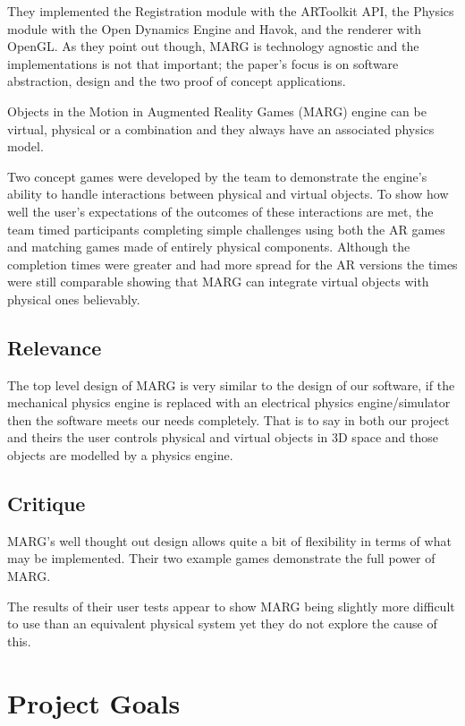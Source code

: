 They implemented the Registration module with the ARToolkit API, the Physics module with the Open Dynamics Engine and Havok, and the renderer with OpenGL. As they point out though, MARG is technology agnostic and the implementations is not that important; the paper's focus is on software abstraction, design and the two proof of concept applications.

Objects in the Motion in Augmented Reality Games (MARG) engine can be virtual, physical or a combination and they always have an associated physics model.

Two concept games were developed by the team to demonstrate the engine's ability to handle interactions between physical and virtual objects. To show how well the user's expectations of the outcomes of these interactions are met, the team timed participants completing simple challenges using both the AR games and matching games made of entirely physical components. Although the completion times were greater and had more spread for the AR versions the times were still comparable
showing that MARG can integrate virtual objects with physical ones believably.

\subsection{Relevance}
The top level design of MARG is very similar to the design of our software, if the mechanical physics engine is replaced with an electrical physics engine/simulator then the software meets our needs completely. That is to say in both our project and theirs the user controls physical and virtual objects in 3D space and those objects are modelled by a physics engine.

\subsection{Critique}
MARG's well thought out design allows quite a bit of flexibility in terms of what may be implemented. Their two example games demonstrate the full power of MARG.

The results of their user tests appear to show MARG being slightly more difficult to use than an equivalent physical system yet they do not explore the cause of this.


\section{Project Goals}

